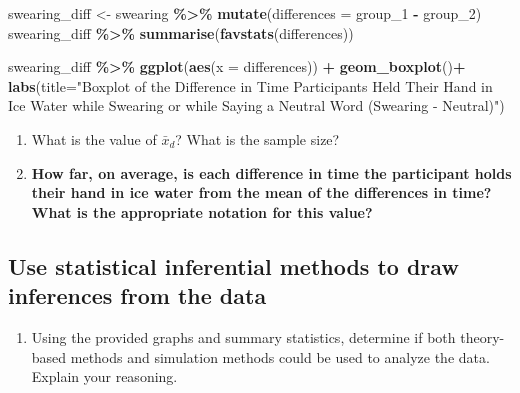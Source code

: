 \documentclass[
]{report}
\newenvironment{Shaded}{\begin{snugshade}}{\end{snugshade}}
\newcommand{\AttributeTok}[1]{\textcolor[rgb]{0.13,0.29,0.53}{#1}}
\newcommand{\FunctionTok}[1]{\textcolor[rgb]{0.13,0.29,0.53}{\textbf{#1}}}
\newcommand{\NormalTok}[1]{#1}
\newcommand{\OtherTok}[1]{\textcolor[rgb]{0.56,0.35,0.01}{#1}}
\newcommand{\SpecialCharTok}[1]{\textcolor[rgb]{0.81,0.36,0.00}{\textbf{#1}}}
\newcommand{\StringTok}[1]{\textcolor[rgb]{0.31,0.60,0.02}{#1}}
\providecommand{\tightlist}{%
  \setlength{\itemsep}{0pt}\setlength{\parskip}{0pt}}
\begin{document}
\begin{Shaded}
\begin{Highlighting}[]
\NormalTok{swearing\_diff }\OtherTok{\textless{}{-}}\NormalTok{ swearing }\SpecialCharTok{\%\textgreater{}\%} 
  \FunctionTok{mutate}\NormalTok{(}\AttributeTok{differences =}\NormalTok{ group\_1 }\SpecialCharTok{{-}}\NormalTok{ group\_2)}
\NormalTok{swearing\_diff }\SpecialCharTok{\%\textgreater{}\%} 
    \FunctionTok{summarise}\NormalTok{(}\FunctionTok{favstats}\NormalTok{(differences))}

\NormalTok{swearing\_diff }\SpecialCharTok{\%\textgreater{}\%} 
    \FunctionTok{ggplot}\NormalTok{(}\FunctionTok{aes}\NormalTok{(}\AttributeTok{x =}\NormalTok{ differences)) }\SpecialCharTok{+}
    \FunctionTok{geom\_boxplot}\NormalTok{()}\SpecialCharTok{+}
    \FunctionTok{labs}\NormalTok{(}\AttributeTok{title=}\StringTok{"Boxplot of the Difference in Time Participants Held Their Hand }
\StringTok{         in Ice Water while Swearing or while Saying a Neutral Word (Swearing {-} Neutral)"}\NormalTok{)}
\end{Highlighting}
\end{Shaded}

\begin{enumerate}
\def\labelenumi{\arabic{enumi}.}
\setcounter{enumi}{5}
\item
  What is the value of \(\bar{x}_d\)? What is the sample size?
  \vspace{0.25in}
\item
  \textbf{How far, on average, is each difference in time the participant holds their hand in ice water from the mean of the differences in time? What is the appropriate notation for this value?}
\end{enumerate}

\vspace{0.4in}

\subsection*{Use statistical inferential methods to draw inferences from the data}\label{use-statistical-inferential-methods-to-draw-inferences-from-the-data-4}

\begin{enumerate}
\def\labelenumi{\arabic{enumi}.}
\setcounter{enumi}{7}
\tightlist
\item
  Using the provided graphs and summary statistics, determine if both theory-based methods and simulation methods could be used to analyze the data. Explain your reasoning.
\end{enumerate}
\end{document}
